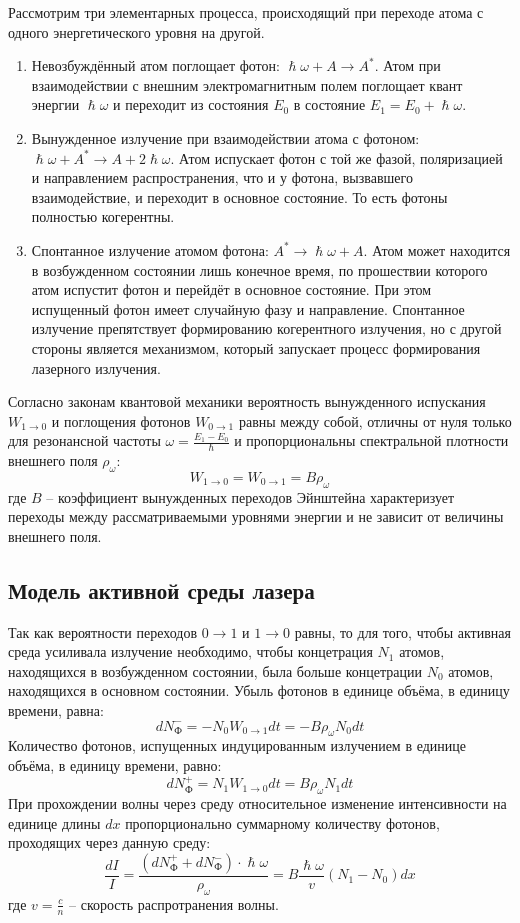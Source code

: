 Рассмотрим три элементарных процесса, происходящий при переходе атома с одного 
энергетического уровня на другой.
\begin{enumerate}
	\item Невозбуждённый атом поглощает фотон: $\hslash \omega + A \rightarrow 
	A^*$. Атом при взаимодействии с внешним электромагнитным полем поглощает 
	квант энергии $\hslash \omega$ и переходит из состояния $E_0$ в состояние 
	$E_1 = E_0 + \hslash \omega$.

	\item Вынужденное излучение при взаимодействии атома с фотоном: $\hslash 
	\omega + A^* \rightarrow A + 2 \hslash \omega$. Атом испускает фотон с той 
	же фазой, поляризацией и направлением распространения, что и у фотона, 
	вызвавшего взаимодействие, и переходит в основное состояние. То есть фотоны 
	полностью когерентны.

	\item Спонтанное излучение атомом фотона: $A^* \rightarrow \hslash 
	\omega + A$. Атом может находится в возбужденном состоянии лишь конечное 
	время, по прошествии которого атом испустит фотон и перейдёт в основное 
	состояние. При этом испущенный фотон имеет случайную фазу и направление. 
	Спонтанное излучение препятствует формированию когерентного излучения, но с 
	другой стороны является механизмом, который запускает процесс формирования 
	лазерного излучения.

\end{enumerate}

Согласно законам квантовой механики вероятность вынужденного испускания 
$W_{1\rightarrow0}$ и поглощения фотонов $W_{0\rightarrow1}$ равны между собой, 
отличны от нуля только для резонансной частоты $\omega = \frac{E_1 - 
E_0}{\hslash}$ и пропорциональны спектральной плотности внешнего поля 
$\rho_\omega$:
$$W_{1\rightarrow0} = W_{0\rightarrow1} = B \rho_\omega$$
где $B$ -- коэффициент вынужденных переходов Эйнштейна характеризует переходы 
между рассматриваемыми уровнями энергии и не зависит от величины внешнего поля.

\subsection*{Модель активной среды лазера}

Так как вероятности переходов $0\rightarrow1$ и $1\rightarrow0$ равны, то для 
того, чтобы активная среда усиливала излучение необходимо, чтобы концетрация 
$N_1$ атомов, находящихся в возбужденном состоянии, была больше концетрации 
$N_0$ атомов, находящихся в основном состоянии. Убыль фотонов в единице объёма, 
в единицу времени, равна:
$$
d N_Ф^- = - N_0 W_{0\rightarrow1} dt = - B \rho_\omega N_0 dt
$$
Количество фотонов, испущенных индуцированным излучением в единице объёма, в 
единицу времени, равно:
$$
d N_Ф^+ = N_1 W_{1\rightarrow0} dt = B \rho_\omega N_1 dt
$$
При прохождении волны через среду относительное изменение интенсивности на 
единице длины $dx$ пропорционально суммарному количеству фотонов, проходящих 
через данную среду:
$$
\frac{dI}{I} = \frac{\left( d N_Ф^+ + d N_Ф^- \right) \cdot 
\hslash \omega}{\rho_\omega} = B \frac{\hslash \omega}{v} \left(N_1 - N_0 
\right) dx
$$
где $v = \frac{c}{n}$ -- скорость распротранения волны.

